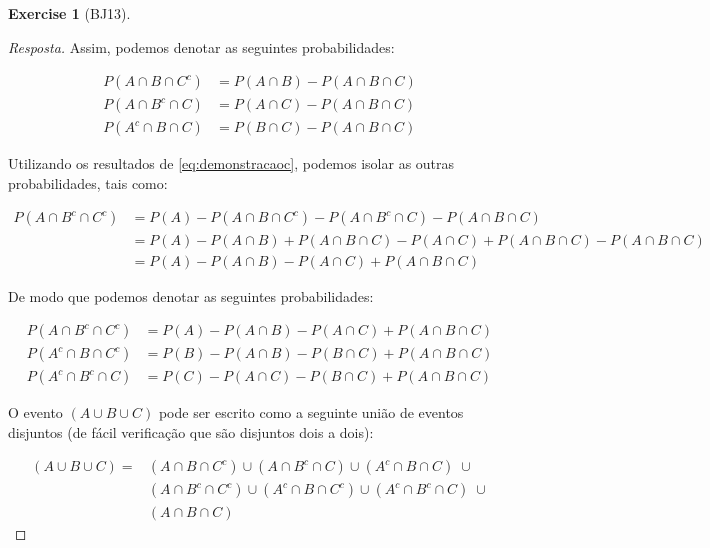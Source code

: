 \documentclass[
]{article}
\theoremstyle{definition}
\theoremstyle{definition}
\theoremstyle{definition}
\newtheorem{exercise}{Exercise}[section]
\theoremstyle{definition}
\theoremstyle{remark}
\begin{document}
\begin{exercise}[BJ13]
\begin{proof}[Resposta]
Assim, podemos denotar as seguintes probabilidades:

\begin{equation}
\begin{split}
P(A \cap B \cap C^{c}) &= P(A \cap B) - P(A \cap B \cap C) \\
P(A \cap B^{c} \cap C) &= P(A \cap C) - P(A \cap B \cap C) \\
P(A^{c} \cap B \cap C) &= P(B \cap C) - P(A \cap B \cap C)
\label{eq:demonstracaoc}
\end{split}
\end{equation}

Utilizando os resultados de \eqref{eq:demonstracaoc}, podemos isolar as outras probabilidades, tais como:

\begin{align*}
P(A \cap B^{c} \cap C^{c}) &= P(A) - P(A \cap B \cap C^{c}) - P(A \cap B^{c} \cap C) - P(A \cap B \cap C) \\
&= P(A) - P(A \cap B) + P(A \cap B \cap C) - P(A \cap C) + P(A \cap B \cap C) - P(A \cap B \cap C) \\
&= P(A) - P(A \cap B) - P(A \cap C) + P(A \cap B \cap C)
\end{align*}

De modo que podemos denotar as seguintes probabilidades:

\begin{equation}
\begin{split}
P(A \cap B^{c} \cap C^{c}) &= P(A) - P(A \cap B) - P(A \cap C) + P(A \cap B \cap C) \\
P(A^{c} \cap B \cap C^{c}) &= P(B) - P(A \cap B) - P(B \cap C) + P(A \cap B \cap C) \\
P(A^{c} \cap B^{c} \cap C) &= P(C) - P(A \cap C) - P(B \cap C) + P(A \cap B \cap C)
\label{eq:demonstracaod}
\end{split}
\end{equation}

O evento \((A \cup B \cup C)\) pode ser escrito como a seguinte união de eventos disjuntos (de fácil verificação que são disjuntos dois a dois):

\begin{equation}
\begin{split}
(A \cup B \cup C) = &(A \cap B \cap C^{c}) \cup (A \cap B^{c} \cap C) \cup (A^{c} \cap B \cap C) \; \cup \\
&(A \cap B^{c} \cap C^{c}) \cup (A^{c} \cap B \cap C^{c}) \cup (A^{c} \cap B^{c} \cap C) \; \cup \\
&(A \cap B \cap C)
\label{eq:eqfinala}
\end{split}
\end{equation}


\end{proof}
\end{exercise}
\end{document}
